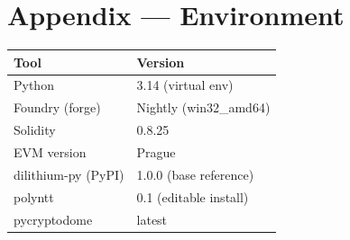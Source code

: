 \documentclass[11pt,a4paper]{article}
\begin{document}
\section{Appendix — Environment}

\begin{center}
\begin{tabular}{ll}
\toprule
\textbf{Tool} & \textbf{Version} \\
\midrule
Python & 3.14 (virtual env) \\
Foundry (forge) & Nightly (win32\_amd64) \\
Solidity & 0.8.25 \\
EVM version & Prague \\
dilithium-py (PyPI) & 1.0.0 (base reference) \\
polyntt & 0.1 (editable install) \\
pycryptodome & latest \\
\bottomrule
\end{tabular}
\end{center}

\end{document}
